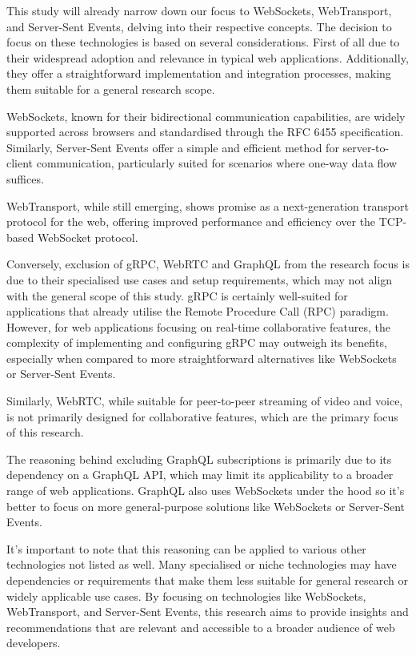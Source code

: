 This study will already narrow down our focus to WebSockets, WebTransport, and Server-Sent Events, delving into their respective concepts. The decision to focus on these technologies is based on several considerations. First of all due to their widespread adoption and relevance in typical web applications. Additionally, they offer a straightforward implementation and integration processes, making them suitable for a general research scope.

WebSockets, known for their bidirectional communication capabilities, are widely supported across browsers and standardised through the RFC 6455 specification. Similarly, Server-Sent Events offer a simple and efficient method for server-to-client communication, particularly suited for scenarios where one-way data flow suffices.

WebTransport, while still emerging, shows promise as a next-generation transport protocol for the web, offering improved performance and efficiency over the TCP-based WebSocket protocol.

Conversely, exclusion of gRPC, WebRTC and GraphQL from the research focus is due to their specialised use cases and setup requirements, which may not align with the general scope of this study. gRPC is certainly well-suited for applications that already utilise the Remote Procedure Call (RPC) paradigm. However, for web applications focusing on real-time collaborative features, the complexity of implementing and configuring gRPC may outweigh its benefits, especially when compared to more straightforward alternatives like WebSockets or Server-Sent Events.

Similarly, WebRTC, while suitable for peer-to-peer streaming of video and voice, is not primarily designed for collaborative features, which are the primary focus of this research.

The reasoning behind excluding GraphQL subscriptions is primarily due to its dependency on a GraphQL API, which may limit its applicability to a broader range of web applications. GraphQL also uses WebSockets under the hood so it's better to focus on more general-purpose solutions like WebSockets or Server-Sent Events.

It's important to note that this reasoning can be applied to various other technologies not listed as well. Many specialised or niche technologies may have dependencies or requirements that make them less suitable for general research or widely applicable use cases. By focusing on technologies like WebSockets, WebTransport, and Server-Sent Events, this research aims to provide insights and recommendations that are relevant and accessible to a broader audience of web developers.

